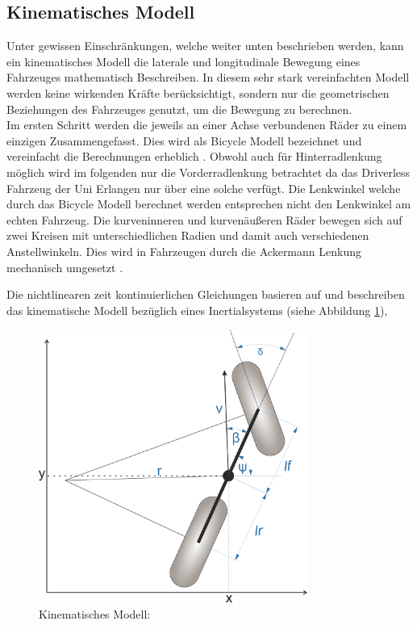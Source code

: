 \documentclass{like}
\begin{document}
\subsection{Kinematisches Modell}
\label{kinematicModel}
Unter gewissen Einschränkungen, welche weiter unten beschrieben werden, kann ein kinematisches Modell die laterale und longitudinale Bewegung eines Fahrzeuges mathematisch Beschreiben. In diesem sehr stark vereinfachten Modell werden keine wirkenden Kräfte berücksichtigt, sondern nur die geometrischen Beziehungen des Fahrzeuges genutzt, um die Bewegung zu berechnen. \\
Im ersten Schritt werden die jeweils an einer Achse verbundenen Räder zu einem einzigen Zusammengefasst. Dies wird als Bicycle Modell bezeichnet und vereinfacht die Berechnungen erheblich \cite{BicycleModel}. Obwohl auch für Hinterradlenkung möglich wird im folgenden nur die Vorderradlenkung betrachtet da das Driverless Fahrzeug der Uni Erlangen nur über eine solche verfügt. Die Lenkwinkel welche durch das Bicycle Modell berechnet werden entsprechen nicht den Lenkwinkel am echten Fahrzeug. Die kurveninneren und kurvenäußeren Räder bewegen sich auf zwei Kreisen mit unterschiedlichen Radien und damit auch verschiedenen Anstellwinkeln. Dies wird in Fahrzeugen durch die Ackermann Lenkung mechanisch umgesetzt \cite{rajamani2011vehicle}.


Die nichtlinearen zeit kontinuierlichen Gleichungen basieren auf \cite{rajamani2011vehicle, 7225830} und beschreiben das kinematische Modell bezüglich eines Inertialsystems (siehe Abbildung \ref{fig:kinmodel}),

\begin{figure}[ht!]
	\centering
	\includegraphics[width=250pt]{Abbildungen/kinBicycle.png}
	\caption{Kinematisches Modell:}
	\label{fig:kinmodel}
\end{figure}
\end{document}
